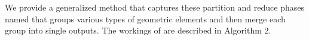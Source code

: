 \documentclass[10pt,journal,cspaper,compsoc]{IEEEtran}
\begin{document}




We provide a generalized method that captures these partition and reduce
phases named  that groups various types of geometric
elements and then merge each group into single outputs.  The workings of
 are described in Algorithm 2.
\end{document}
